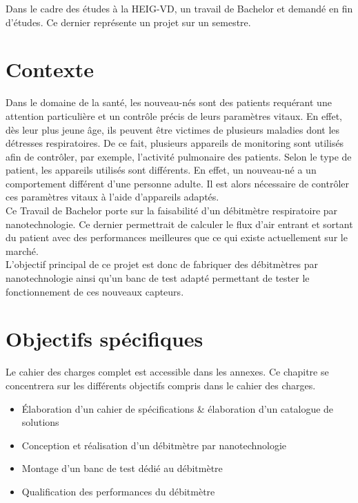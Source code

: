 Dans le cadre des études à la HEIG-VD, un travail de Bachelor et demandé en fin d'études. Ce dernier représente un projet sur un semestre. 

\section{Contexte}
Dans le domaine de la santé, les nouveau-nés sont des patients requérant une attention particulière et un contrôle précis de leurs 
paramètres vitaux. En effet, dès leur plus jeune âge, ils peuvent être victimes de plusieurs maladies dont les détresses respiratoires. 
De ce fait, plusieurs appareils de monitoring sont utilisés afin de contrôler, par exemple, l'activité pulmonaire des patients. 
Selon le type de patient, les appareils utilisés sont différents. En effet, un nouveau-né a un comportement différent d'une personne 
adulte. Il est alors nécessaire de contrôler ces paramètres vitaux à l'aide d'appareils adaptés. \\

Ce Travail de Bachelor porte sur la faisabilité d'un débitmètre respiratoire par nanotechnologie. Ce dernier permettrait de calculer le flux 
d'air entrant et sortant du patient avec des performances meilleures que ce qui existe actuellement sur le marché. \\

L'objectif principal de ce projet est donc de fabriquer des débitmètres par nanotechnologie ainsi qu'un banc de test adapté permettant de tester le 
fonctionnement de ces nouveaux capteurs. 

\section{Objectifs spécifiques}
Le cahier des charges complet est accessible dans les annexes. Ce chapitre se concentrera sur les différents objectifs compris dans le cahier 
des charges. \\
\begin{itemize}
    \item Élaboration d'un cahier de spécifications \& élaboration d'un catalogue de solutions
    \item Conception et réalisation d'un débitmètre par nanotechnologie
    \item Montage d'un banc de test dédié au débitmètre
    \item Qualification des performances du débitmètre
\end{itemize}

